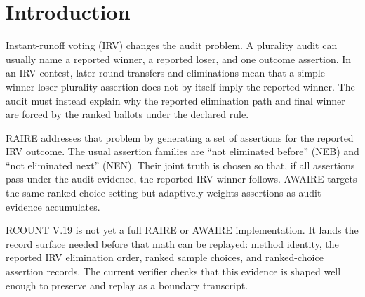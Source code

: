 \section{Introduction}

Instant-runoff voting (IRV) changes the audit problem. A plurality audit can
usually name a reported winner, a reported loser, and one outcome assertion. In
an IRV contest, later-round transfers and eliminations mean that a simple
winner-loser plurality assertion does not by itself imply the reported winner.
The audit must instead explain why the reported elimination path and final
winner are forced by the ranked ballots under the declared rule.

RAIRE addresses that problem by generating a set of assertions for the reported
IRV outcome. The usual assertion families are ``not eliminated before'' (NEB)
and ``not eliminated next'' (NEN). Their joint truth is chosen so that, if all
assertions pass under the audit evidence, the reported IRV winner follows.
AWAIRE targets the same ranked-choice setting but adaptively weights assertions
as audit evidence accumulates.

RCOUNT V.19 is not yet a full RAIRE or AWAIRE implementation. It lands the
record surface needed before that math can be replayed: method identity, the
reported IRV elimination order, ranked sample choices, and ranked-choice
assertion records. The current verifier checks that this evidence is shaped
well enough to preserve and replay as a boundary transcript.
